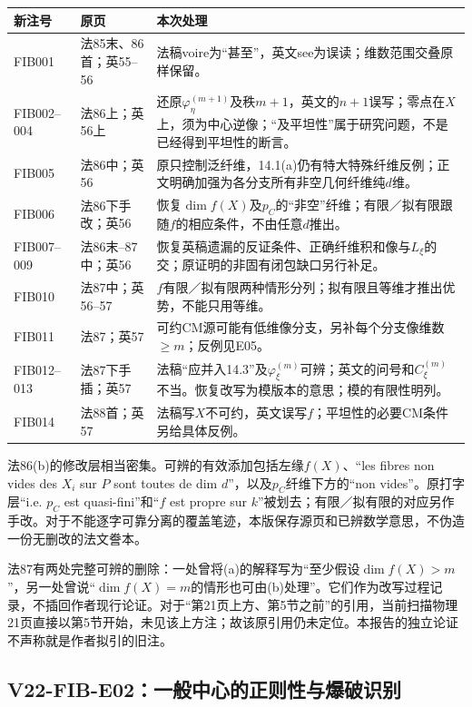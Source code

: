 \documentclass[UTF8,a4paper]{ctexbook}
\begin{document}
\begin{longtable}{@{}p{.15\linewidth}p{.18\linewidth}p{.56\linewidth}@{}}
\toprule
新注号 & 原页 & 本次处理\\
\midrule\endhead
FIB001 & 法85末、86首；英55--56 & 法稿voire为“甚至”，英文see为误读；维数范围交叠原样保留。\\
FIB002--004 & 法86上；英56上 & 还原$\varphi_\eta^{(m+1)}$及秩$m+1$，英文的$n+1$误写；零点在$X$上，须为中心逆像；“及平坦性”属于研究问题，不是已经得到平坦性的断言。\\
FIB005 & 法86中；英56 & 原只控制泛纤维，14.1(a)仍有特大特殊纤维反例；正文明确加强为各分支所有非空几何纤维纯$d$维。\\
FIB006 & 法86下手改；英56 & 恢复$\dim f(X)$及$p_C$的“非空”纤维；有限／拟有限跟随$f$的相应条件，不由任意$d$推出。\\
FIB007--009 & 法86末--87中；英56 & 恢复英稿遗漏的反证条件、正确纤维积和像与$L_\xi$的交；原证明的非固有闭包缺口另行补足。\\
FIB010 & 法87中；英56--57 & $f$有限／拟有限两种情形分列；拟有限且等维才推出优势，不能只用等维。\\
FIB011 & 法87；英57 & 可约CM源可能有低维像分支，另补每个分支像维数$\geq m$；反例见E05。\\
FIB012--013 & 法87下手插；英57 & 法稿“应并入14.3”及$\varphi_\xi^{(m)}$可辨；英文的问号和$C_\xi^{(m)}$不当。恢复改写为模版本的意思；模的有限性明列。\\
FIB014 & 法88首；英57 & 法稿写$X$不可约，英文误写$f$；平坦性的必要CM条件另给具体反例。\\
\bottomrule
\end{longtable}

法86(b)的修改层相当密集。可辨的有效添加包括左缘$f(X)$、“les fibres non vides des $X_i$ sur $P$ sont toutes de dim $d$”，以及$p_C$纤维下方的“non vides”。原打字层“i.e. $p_C$ est quasi-fini”和“$f$ est propre sur $k$”被划去；有限／拟有限的对应另作手改。对于不能逐字可靠分离的覆盖笔迹，本版保存源页和已辨数学意思，不伪造一份无删改的法文誊本。

法87有两处完整可辨的删除：一处曾将(a)的解释写为“至少假设$\dim f(X)>m$”，另一处曾说“$\dim f(X)=m$的情形也可由(b)处理”。它们作为改写过程记录，不插回作者现行论证。对于“第21页上方、第5节之前”的引用，当前扫描物理21页直接以第5节开始，未见该上方注；故该原引用仍未定位。本报告的独立论证不声称就是作者拟引的旧注。

\subsection*{V22-FIB-E02：一般中心的正则性与爆破识别}
\end{document}
